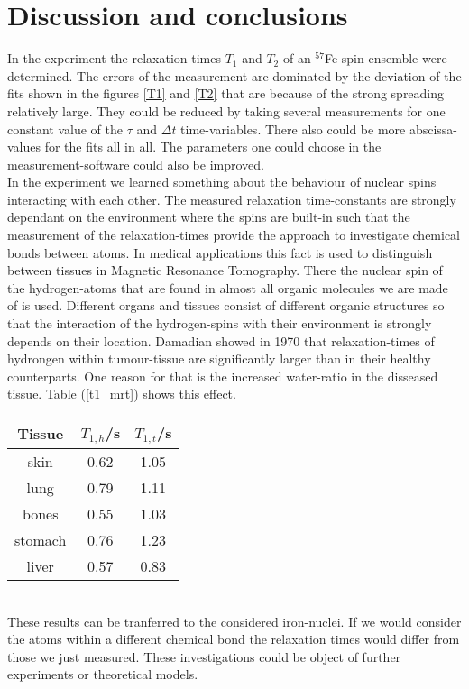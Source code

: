 \section{Discussion and conclusions}
	In the experiment the relaxation times $T_1$ and $T_2$ of an $^{57}$Fe spin ensemble were determined. The errors of the measurement are dominated by the deviation of the fits shown in the figures \ref{T1} and \ref{T2} that are because of the strong spreading relatively large. They could be reduced by taking several measurements for one constant value of the $\tau$ and $\Delta t$ time-variables. There also could be more abscissa-values for the fits all in all. The parameters one could choose in the measurement-software could also be improved.\\
	In the experiment we learned something about the behaviour of nuclear spins interacting with each other. The measured relaxation time-constants are strongly dependant on the environment where the spins are built-in such that the measurement of the relaxation-times provide the approach to investigate chemical bonds between atoms. In medical applications this fact is used to distinguish between tissues in Magnetic Resonance Tomography. There the nuclear spin of the hydrogen-atoms that are found in almost all organic molecules we are made of is used. Different organs and tissues consist of different organic structures so that the interaction of the hydrogen-spins with their environment is strongly depends on their location. Damadian showed in 1970 that relaxation-times of hydrongen within tumour-tissue are significantly larger than in their healthy counterparts. One reason for that is the increased water-ratio in the disseased tissue.\cite{t1Med} Table (\ref{t1_mrt}) shows this effect.\\
	\minipanf
	\centering
		\captionsetup{justification=raggedright, margin =4cm} 
		\begin{tabular}{c|cc}
			Tissue		&		$T_{1,h}$/s		&	$T_{1,t}$/s\\
			\hline
			skin		&		0.62			&	1.05\\
			lung		&		0.79			&	1.11\\
			bones		&		0.55			&	1.03\\
			stomach		&		0.76			&	1.23\\
			liver		&		0.57			&	0.83\\
		\end{tabular} 
		\label{t1_mrt}
	\minipend
	\ \\
	These results can be tranferred to the considered iron-nuclei. If we would consider the atoms within a different chemical bond the relaxation times would differ from those we just measured. These investigations could be object of further experiments or theoretical models.
	

